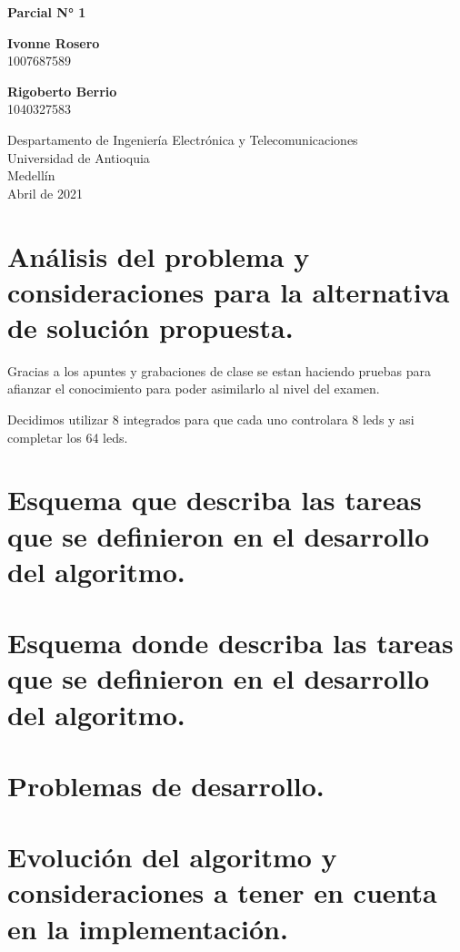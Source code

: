 \documentclass{article}
\begin{document}
\begin{titlepage}
    \begin{center}
        \vspace*{1cm}
            
        \Huge
        \textbf{Parcial N° 1}
            
        \vspace{2 cm}
        \LARGE
    
            
        \vspace{2 cm}
            
        \textbf{Ivonne  Rosero }\\
        \large
        1007687589
        
        \vspace{2cm}
        \LARGE
        
        \textbf{Rigoberto Berrio}\\
        \large
        1040327583
            
        \vfill
            
        \vspace{0.8cm}
            
        \Large
        Despartamento de Ingeniería Electrónica y Telecomunicaciones\\
        Universidad de Antioquia\\
        Medellín\\
        Abril de 2021
            
    \end{center}
\end{titlepage}

\tableofcontents
\newpage
\section{Análisis del problema y consideraciones para la alternativa de solución propuesta.}\label{intro}
 
Gracias a los apuntes y grabaciones de clase se estan haciendo pruebas para afianzar el conocimiento para poder asimilarlo  al nivel del examen.

Decidimos utilizar 8 integrados para que cada uno controlara 8 leds y asi completar los 64 leds.


\section{Esquema que describa las tareas que se definieron en el desarrollo del algoritmo.}\label{intro}




\section{Esquema donde describa las tareas que se definieron en el desarrollo del algoritmo.}\label{intro}

\section{Problemas de desarrollo.}\label{intro}

\section{Evolución del algoritmo y consideraciones a tener en cuenta en la implementación.}\label{intro}
\end{document}
